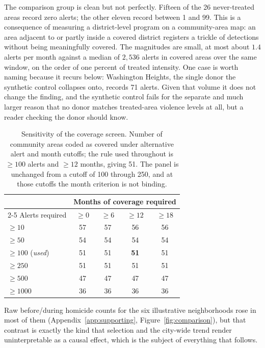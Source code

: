 \documentclass[12pt]{article}
\begin{document}
The comparison group is clean but not perfectly. Fifteen of the 26 never-treated areas
record zero alerts; the other eleven record between 1 and 99. This is a consequence of
measuring a district-level program on a community-area map: an area adjacent to or partly
inside a covered district registers a trickle of detections without being meaningfully
covered. The magnitudes are small, at most about $1.4$ alerts per month against a median of
$2{,}536$ alerts in covered areas over the same window, on the order of one percent of
treated intensity. One case is worth naming because it recurs below: Washington Heights,
the single donor the synthetic control collapses onto, records 71 alerts. Given that volume
it does not change the finding, and the synthetic control fails for the separate and much
larger reason that no donor matches treated-area violence levels at all, but a reader
checking the donor should know.

\begin{table}[H]
\centering
\small
\caption{Sensitivity of the coverage screen. Number of community areas coded as covered
under alternative alert and month cutoffs; the rule used throughout is $\geq 100$ alerts and
$\geq 12$ months, giving 51. The panel is unchanged from a cutoff of 100 through 250, and at
those cutoffs the month criterion is not binding.}
\label{tab:threshold}
\begin{tabular}{lcccc}
\toprule
& \multicolumn{4}{c}{Months of coverage required} \\
\cmidrule(lr){2-5}
Alerts required & $\geq 0$ & $\geq 6$ & $\geq 12$ & $\geq 18$ \\
\midrule
$\geq 10$            & 57 & 57 & 56 & 56 \\
$\geq 50$            & 54 & 54 & 54 & 54 \\
$\geq 100$ (\emph{used}) & 51 & 51 & \textbf{51} & 51 \\
$\geq 250$           & 51 & 51 & 51 & 51 \\
$\geq 500$           & 47 & 47 & 47 & 47 \\
$\geq 1000$          & 36 & 36 & 36 & 36 \\
\bottomrule
\end{tabular}
\end{table}

Raw before/during homicide counts for the six illustrative neighborhoods rose in most of
them (Appendix~\ref{app:supporting}, Figure~\ref{fig:comparison}), but that contrast is
exactly the kind that selection and the city-wide trend render uninterpretable as a causal
effect, which is the subject of everything that follows.
\end{document}
